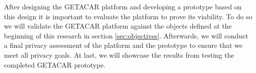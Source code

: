 After designing the GETACAR platform and developing a prototype based on this design it is important to evaluate the platform to prove its viability. To do so we will validate the GETACAR platform against the objects defined at the beginning of this research in section \ref{sec:objectives}. Afterwards, we will conduct a final privacy assessment of the platform and the prototype to ensure that we meet all privacy goals. At last, we will showcase the results from testing the completed GETACAR prototype. 
